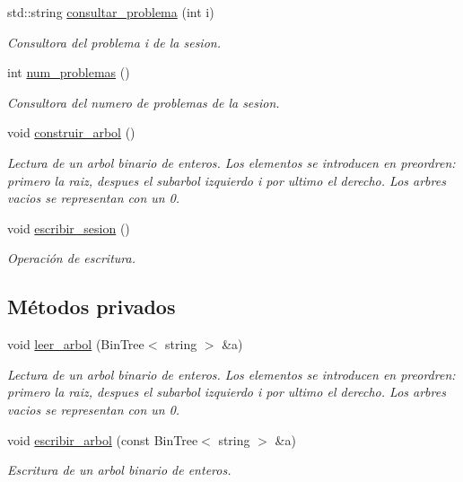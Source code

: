 \begin{DoxyCompactItemize}
std\+::string \mbox{\hyperlink{class_sesion_a035f4d3118ed20daedf95307128a1fbb}{consultar\+\_\+problema}} (int i)
\begin{DoxyCompactList}\small\item\em Consultora del problema i de la sesion. \end{DoxyCompactList}\item 
int \mbox{\hyperlink{class_sesion_a7778f2d0cfff81138221fe661ab69e2c}{num\+\_\+problemas}} ()
\begin{DoxyCompactList}\small\item\em Consultora del numero de problemas de la sesion. \end{DoxyCompactList}\item 
void \mbox{\hyperlink{class_sesion_a3ba86990204dd799378a62b90cfbb58a}{construir\+\_\+arbol}} ()
\begin{DoxyCompactList}\small\item\em Lectura de un arbol binario de enteros. Los elementos se introducen en preordren\+: primero la raiz, despues el subarbol izquierdo i por ultimo el derecho. Los arbres vacios se representan con un 0. \end{DoxyCompactList}\item 
void \mbox{\hyperlink{class_sesion_a0243a367d0e9787328c3a956bd8846ef}{escribir\+\_\+sesion}} ()
\begin{DoxyCompactList}\small\item\em Operación de escritura. \end{DoxyCompactList}\end{DoxyCompactItemize}
\subsection*{Métodos privados}
\begin{DoxyCompactItemize}
\item 
void \mbox{\hyperlink{class_sesion_adea0f5f335e3eab364dfc59c28d790f3}{leer\+\_\+arbol}} (Bin\+Tree$<$ string $>$ \&a)
\begin{DoxyCompactList}\small\item\em Lectura de un arbol binario de enteros. Los elementos se introducen en preordren\+: primero la raiz, despues el subarbol izquierdo i por ultimo el derecho. Los arbres vacios se representan con un 0. \end{DoxyCompactList}\item 
void \mbox{\hyperlink{class_sesion_a05641874607ce3a3b3c495437938bf02}{escribir\+\_\+arbol}} (const Bin\+Tree$<$ string $>$ \&a)
\begin{DoxyCompactList}\small\item\em Escritura de un arbol binario de enteros. \end{DoxyCompactList}\end{DoxyCompactItemize}
